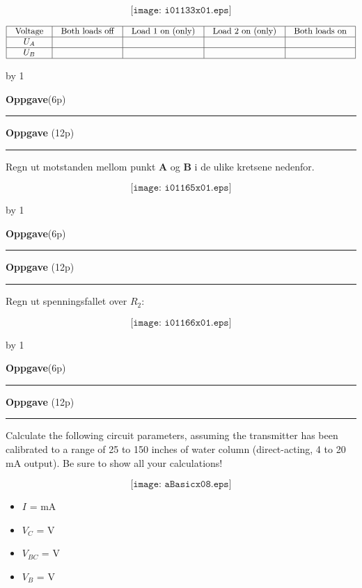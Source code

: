 \documentclass[12pt,a4paper]{article}
\def\oppgave{
            \advance\questnum by 1
	    \ifthenelse{\questnum>0\AND \questnum<9}
	    {
                \vskip 1cm
		\textbf{Oppgave}\hskip 5pt\the\questnum \hfill \hfill(6p)
		\vskip 3pt
		\hrule
	\vskip 0.5cm}
	{
                \vskip 1cm
		\textbf{Oppgave}\hskip 5pt \the\questnum \hfill \hfill(12p)
		\vskip 3pt \hrule \vskip 0.5cm }

		}
\begin{document}
$$\texttt{[image: i01133x01.eps]}$$


$$\vbox{\offinterlineskip
\halign{\strut
\vrule \quad\hfil # \ \hfil & 
\vrule \quad\hfil # \ \hfil & 
\vrule \quad\hfil # \ \hfil & 
\vrule \quad\hfil # \ \hfil & 
\vrule \quad\hfil # \ \hfil \vrule \cr
\noalign{\hrule}
%
Voltage & Both loads off & Load 1 on (only) & Load 2 on (only) & Both loads on \cr
%
\noalign{\hrule}
%
$U_A$ &  &  &  &  \cr
%
\noalign{\hrule}
%
$U_B$ &  &  &  &  \cr
%
\noalign{\hrule}
} %
}$$ %

\vskip 2.5pt 

\vskip 2.5pt 
\newpage
\oppgave{}%
\vskip 2.5pt 

Regn ut motstanden mellom punkt \textbf{A} og \textbf{B} i de ulike kretsene nedenfor. 

$$\texttt{[image: i01165x01.eps]}$$
\vskip 2.5pt 

\vskip 2.5pt 
\newpage
\oppgave{}%
\vskip 2.5pt 

Regn ut spenningsfallet over $R_2$:

$$\texttt{[image: i01166x01.eps]}$$
\vskip 2.5pt 

\vskip 2.5pt 
\newpage
\oppgave{}%
\vskip 2.5pt 

Calculate the following circuit parameters, assuming the transmitter has been calibrated to a range of 25 to 150 inches of water column (direct-acting, 4 to 20 mA output).  Be sure to show all your calculations!

$$\texttt{[image: aBasicx08.eps]}$$
\begin{itemize}
\item{} $I$ = \underbar{\hskip 50pt} mA
\vskip 10pt
\item{} $V_{C}$ = \underbar{\hskip 50pt} V 
\vskip 10pt
\item{} $V_{BC}$ = \underbar{\hskip 50pt} V 
\vskip 10pt
\item{} $V_{B}$ = \underbar{\hskip 50pt} V 
\end{itemize}
\vskip 2.5pt 
\end{document}
